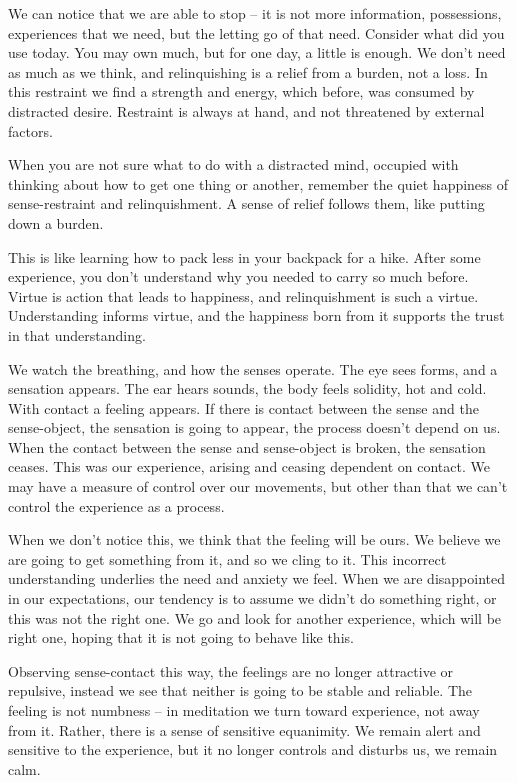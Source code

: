 We can notice that we are able to stop -- it is not more information,
possessions, experiences that we need, but the letting go of that need.
Consider what did you use today. You may own much, but for one day, a
little is enough. We don't need as much as we think, and relinquishing
is a relief from a burden, not a loss. In this restraint we find a
strength and energy, which before, was consumed by distracted desire.
Restraint is always at hand, and not threatened by external factors.

When you are not sure what to do with a distracted mind, occupied with
thinking about how to get one thing or another, remember the quiet
happiness of sense-restraint and relinquishment. A sense of relief
follows them, like putting down a burden.

This is like learning how to pack less in your backpack for a hike.
After some experience, you don't understand why you needed to carry so
much before. Virtue is action that leads to happiness, and
relinquishment is such a virtue. Understanding informs virtue, and the
happiness born from it supports the trust in that understanding.

We watch the breathing, and how the senses operate. The eye sees forms,
and a sensation appears. The ear hears sounds, the body feels solidity,
hot and cold. With contact a feeling appears. If there is contact
between the sense and the sense-object, the sensation is going to
appear, the process doesn't depend on us. When the contact between the
sense and sense-object is broken, the sensation ceases. This was our
experience, arising and ceasing dependent on contact. We may have a
measure of control over our movements, but other than that we can't
control the experience as a process.

When we don't notice this, we think that the feeling will be ours. We
believe we are going to get something from it, and so we cling to it.
This incorrect understanding underlies the need and anxiety we feel.
When we are disappointed in our expectations, our tendency is to assume
we didn't do something right, or this was not the right one. We go and
look for another experience, which will be right one, hoping that it is
not going to behave like this.

Observing sense-contact this way, the feelings are no longer attractive
or repulsive, instead we see that neither is going to be stable and
reliable. The feeling is not numbness -- in meditation we turn toward
experience, not away from it. Rather, there is a sense of sensitive
equanimity. We remain alert and sensitive to the experience, but it no
longer controls and disturbs us, we remain calm.

